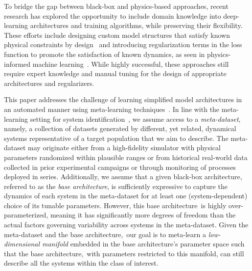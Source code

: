 \documentclass{article}
\newcommand{\base}{{base architecture}}
\begin{document}
To bridge the gap between black-box and physics-based approaches, recent research has explored the opportunity to include domain knowledge into deep-learning architectures and training algorithms, while preserving their flexibility. These efforts include designing custom model structures that satisfy known physical constraints by design~\cite{moradi2023physics, deshpande2023physics, forgione2021continuous} and introducing regularization terms in the loss function to promote the satisfaction of known dynamics, as seen in physics-informed machine learning~\cite{raissi2019physics, nghiem2023physics}. While highly successful, these approaches still require expert knowledge and manual tuning for the design of appropriate architectures and regularizers.

This paper addresses the challenge of learning simplified model architectures in an automated manner using meta-learning techniques~\cite{hospedales2021meta}. In line with the meta-learning setting for system identification~\cite{forgione2023system,chakrabarty2023meta},
we assume access to a \emph{meta-dataset}, namely, a collection of datasets generated by different, yet related, dynamical systems representative of a target population that we aim to describe. The meta-dataset may originate either from a high-fidelity simulator with physical parameters randomized within plausible ranges or from historical real-world data collected in prior experimental campaigns or through monitoring of processes deployed in series.
Additionally, we assume that a given black-box architecture, referred to as the \emph{\base}, is sufficiently expressive to capture the dynamics of each system in the meta-dataset for at least one (system-dependent) choice of its tunable parameters. However, this \base\ is highly over-parameterized, meaning it has significantly more degrees of freedom than the actual factors governing variability across systems in the meta-dataset. 
Given the meta-dataset and the \base,\ our goal is to meta-learn a \emph{low-dimensional manifold} embedded in the \base's parameter space such that the \base,\ with parameters restricted to this manifold, can still describe all the systems within the class of interest. 
\end{document}
